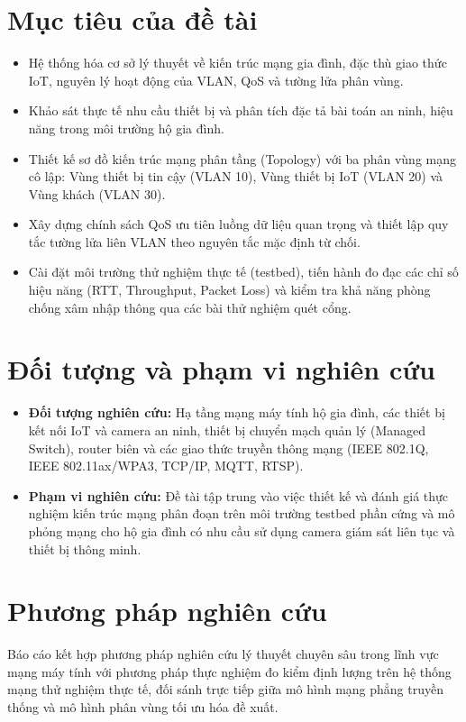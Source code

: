 \section*{Mục tiêu của đề tài}
\begin{itemize}
    \item Hệ thống hóa cơ sở lý thuyết về kiến trúc mạng gia đình, đặc thù giao thức IoT, nguyên lý hoạt động của VLAN, QoS và tường lửa phân vùng.
    \item Khảo sát thực tế nhu cầu thiết bị và phân tích đặc tả bài toán an ninh, hiệu năng trong môi trường hộ gia đình.
    \item Thiết kế sơ đồ kiến trúc mạng phân tầng (Topology) với ba phân vùng mạng cô lập: Vùng thiết bị tin cậy (VLAN 10), Vùng thiết bị IoT (VLAN 20) và Vùng khách (VLAN 30).
    \item Xây dựng chính sách QoS ưu tiên luồng dữ liệu quan trọng và thiết lập quy tắc tường lửa liên VLAN theo nguyên tắc mặc định từ chối.
    \item Cài đặt môi trường thử nghiệm thực tế (testbed), tiến hành đo đạc các chỉ số hiệu năng (RTT, Throughput, Packet Loss) và kiểm tra khả năng phòng chống xâm nhập thông qua các bài thử nghiệm quét cổng.
\end{itemize}

\section*{Đối tượng và phạm vi nghiên cứu}
\begin{itemize}
    \item \textbf{Đối tượng nghiên cứu:} Hạ tầng mạng máy tính hộ gia đình, các thiết bị kết nối IoT và camera an ninh, thiết bị chuyển mạch quản lý (Managed Switch), router biên và các giao thức truyền thông mạng (IEEE 802.1Q, IEEE 802.11ax/WPA3, TCP/IP, MQTT, RTSP).
    \item \textbf{Phạm vi nghiên cứu:} Đề tài tập trung vào việc thiết kế và đánh giá thực nghiệm kiến trúc mạng phân đoạn trên môi trường testbed phần cứng và mô phỏng mạng cho hộ gia đình có nhu cầu sử dụng camera giám sát liên tục và thiết bị thông minh.
\end{itemize}

\section*{Phương pháp nghiên cứu}
Báo cáo kết hợp phương pháp nghiên cứu lý thuyết chuyên sâu trong lĩnh vực mạng máy tính với phương pháp thực nghiệm đo kiểm định lượng trên hệ thống mạng thử nghiệm thực tế, đối sánh trực tiếp giữa mô hình mạng phẳng truyền thống và mô hình phân vùng tối ưu hóa đề xuất.

